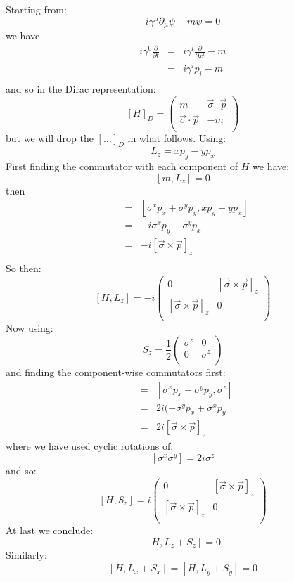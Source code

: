 \documentclass[12pt]{article}
\begin{document}
Starting from:
$$i\gamma^\mu\partial_\mu \psi - m \psi = 0$$
we have
\begin{eqnarray*}
i\gamma^0 \frac{\partial}{\partial t}
&=&
i\gamma^i \frac{\partial}{\partial x^i} - m \\
&=&
i\gamma^i p_i - m \\
\end{eqnarray*}
and so in the Dirac representation:
$$[H]_D = \begin{pmatrix}
m & \vec{\sigma}\cdot\vec{p} \\
\vec{\sigma}\cdot\vec{p} & -m\\
\end{pmatrix}$$
but we will drop the $[\ldots]_D$ in what follows.  Using:
$$L_z = x p_y - y p_x$$
First finding the commutator with each component of $H$ we have:
$$[m, L_z] = 0$$
then
\begin{eqnarray*}
[\vec{\sigma}\cdot\vec{p}, L_z] &=&  [\sigma^x p_x + \sigma^y p_y, x p_y - y p_x] \\
&=&  -i  \sigma^x p_y - \sigma^y p_x \\
&=&  -i  [\vec{\sigma} \times \vec{p}]_z \\
\end{eqnarray*}
So then:
$$
[H, L_z] = -i  \begin{pmatrix}
0 & [\vec{\sigma} \times \vec{p}]_z\\
[\vec{\sigma} \times \vec{p}]_z  & 0\\
\end{pmatrix}
$$
Now using:
$$S_z = \frac{1}{2} \begin{pmatrix}
\sigma^z & 0 \\
0  & \sigma^z\\
\end{pmatrix}
$$
and finding the component-wise commutators first:
\begin{eqnarray*}
[\vec{\sigma}\cdot\vec{p}, \sigma^z] &=&  [\sigma^x p_x + \sigma^y p_y, \sigma^z] \\
&=&  2 i  (-\sigma^y p_x + \sigma^x p_y \\
&=&  2 i  [\vec{\sigma} \times \vec{p}]_z
\end{eqnarray*}
where we have used cyclic rotations of:
$$[\sigma^x \sigma^y] = 2i \sigma^z$$
and so:
$$
[H, S_z] = i  \begin{pmatrix}
0 & [\vec{\sigma} \times \vec{p}]_z\\
[\vec{\sigma} \times \vec{p}]_z  & 0\\
\end{pmatrix}
$$
At last we conclude:
$$[H, L_z + S_z] = 0$$
Similarly:
$$[H, L_x + S_x] = [H, L_y + S_y] = 0$$
\end{document}
